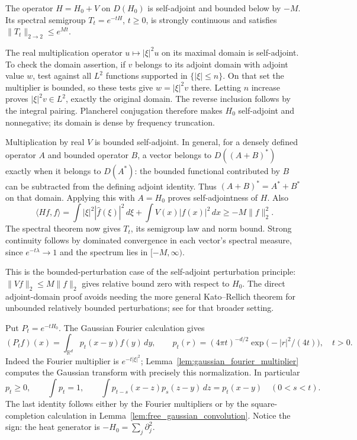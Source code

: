 \begin{proposition}
\label{prop:bounded_schrodinger_selfadjoint}
The operator $H=H_0+V$ on $D(H_0)$ is self-adjoint and bounded below
by $-M$. Its spectral semigroup $T_t=e^{-tH}$, $t\geq0$, is strongly
continuous and satisfies $\|T_t\|_{2\to2}\leq e^{Mt}$.
\end{proposition}
\Proof
The real multiplication operator $u\mapsto|\xi|^2u$ on its maximal
domain is self-adjoint. To check the domain assertion, if $v$ belongs
to its adjoint domain with adjoint value $w$, test against all $L^2$
functions supported in $\{|\xi|\leq n\}$. On that set the multiplier
is bounded, so these tests give $w=|\xi|^2v$ there. Letting $n$ increase
proves $|\xi|^2v\in L^2$, exactly the original domain. The reverse
inclusion follows by the integral pairing. Plancherel conjugation
therefore makes $H_0$ self-adjoint and nonnegative; its domain is dense
by frequency truncation.

Multiplication by real $V$ is bounded self-adjoint. In general, for a
densely defined operator $A$ and bounded operator $B$, a vector belongs
to $D((A+B)^*)$ exactly when it belongs to $D(A^*)$: the bounded
functional contributed by $B$ can be subtracted from the defining
adjoint identity. Thus $(A+B)^*=A^*+B^*$ on that domain. Applying
this with $A=H_0$ proves self-adjointness of $H$. Also
\[
\langle Hf,f\rangle
 =\int |\xi|^2|\widehat f(\xi)|^2\,d\xi
   +\int V(x)|f(x)|^2\,dx\geq-M\|f\|_2^2.
\]
The spectral theorem now gives $T_t$, its semigroup law and norm bound.
Strong continuity follows by dominated convergence in each vector's
spectral measure, since $e^{-t\lambda}\to1$ and the spectrum lies in
$[-M,\infty)$.
\Done

This is the bounded-perturbation case of the self-adjoint perturbation
principle: $\|Vf\|_2\leq M\|f\|_2$ gives relative bound zero with
respect to $H_0$. The direct adjoint-domain proof avoids needing the
more general Kato--Rellich theorem for unbounded relatively bounded
perturbations; see \parencite{Kato1995Perturbation} for that broader setting.

Put $P_t=e^{-tH_0}$. The Gaussian Fourier calculation gives
\[
(P_tf)(x)=\int_{\mathbb R^d}p_t(x-y)f(y)\,dy,\qquad
p_t(r)=(4\pi t)^{-d/2}\exp\bigl(-|r|^2/(4t)\bigr),\quad t>0.
\]
Indeed the Fourier multiplier is $e^{-t|\xi|^2}$;
Lemma~\ref{lem:gaussian_fourier_multiplier} computes the Gaussian
transform with precisely this normalization. In particular
\[
p_t\geq0,\qquad \int p_t=1,\qquad
\int p_{t-s}(x-z)p_s(z-y)\,dz=p_t(x-y)\quad(0<s<t).
\]
The last identity follows either by the Fourier multipliers or by
the square-completion calculation in Lemma~\ref{lem:free_gaussian_convolution}.
Notice the sign:
the heat generator is $-H_0=\sum_j\partial_j^2$.

